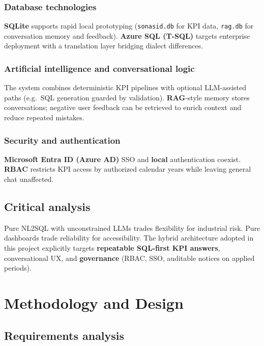 \documentclass[12pt,a4paper,openany]{report}
\begin{document}
\subsection{Database technologies}
\textbf{SQLite} supports rapid local prototyping (\texttt{sonasid.db} for KPI data, \texttt{rag.db} for conversation memory and feedback). \textbf{Azure SQL (T-SQL)} targets enterprise deployment with a translation layer bridging dialect differences.

\subsection{Artificial intelligence and conversational logic}
The system combines deterministic KPI pipelines with optional LLM-assisted paths (e.g.\ SQL generation guarded by validation). \textbf{RAG}-style memory stores conversations; negative user feedback can be retrieved to enrich context and reduce repeated mistakes.

\subsection{Security and authentication}
\textbf{Microsoft Entra ID (Azure AD)} SSO and \textbf{local} authentication coexist. \textbf{RBAC} restricts KPI access by authorized calendar years while leaving general chat unaffected.

\section{Critical analysis}
Pure NL2SQL with unconstrained LLMs trades flexibility for industrial risk. Pure dashboards trade reliability for accessibility. The hybrid architecture adopted in this project explicitly targets \textbf{repeatable SQL-first KPI answers}, conversational UX, and \textbf{governance} (RBAC, SSO, auditable notices on applied periods).

\chapter{Methodology and Design}

\section{Requirements analysis}
\end{document}
